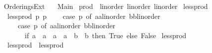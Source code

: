 %
\begin{isabellebody}%
%
%
\isadelimtheory
%
\endisadelimtheory
%
\isatagtheory
{}\isamarkupfalse%
\ Orderings{\isacharunderscore}{\kern0pt}Ext\isanewline
\ \ \ Main\isanewline
{}%
\endisatagtheory
{\isafoldtheory}%
%
\isadelimtheory
\isanewline
%
\endisadelimtheory
\isanewline
{}\isamarkupfalse%
\ prod\ {\isacharcolon}{\kern0pt}{\isacharcolon}{\kern0pt}\ {\isacharparenleft}{\kern0pt}linorder{\isacharcomma}{\kern0pt}\ linorder{\isacharparenright}{\kern0pt}\ linorder\isanewline
{}\isanewline
\isanewline
{}\isamarkupfalse%
\ less{\isacharunderscore}{\kern0pt}prod{\isacharprime}{\kern0pt}\ \isanewline
\ \ {\isachardoublequoteopen}less{\isacharunderscore}{\kern0pt}prod{\isacharprime}{\kern0pt}\ p{}\ p{}\ {\isasymequiv}\isanewline
\ \ \ case\ p{}\ of\ {\isacharparenleft}{\kern0pt}a{}{\isacharcolon}{\kern0pt}{\isacharcolon}{\kern0pt}{\isacharprime}{\kern0pt}a{\isacharcolon}{\kern0pt}{\isacharcolon}{\kern0pt}linorder{\isacharcomma}{\kern0pt}\ b{}{\isacharcolon}{\kern0pt}{\isacharcolon}{\kern0pt}{\isacharprime}{\kern0pt}b{\isacharcolon}{\kern0pt}{\isacharcolon}{\kern0pt}linorder{\isacharparenright}{\kern0pt}\ {\isasymRightarrow}\isanewline
\ \ \ \ \ case\ p{}\ of\ {\isacharparenleft}{\kern0pt}a{}{\isacharcolon}{\kern0pt}{\isacharcolon}{\kern0pt}{\isacharprime}{\kern0pt}a{\isacharcolon}{\kern0pt}{\isacharcolon}{\kern0pt}linorder{\isacharcomma}{\kern0pt}\ b{}{\isacharcolon}{\kern0pt}{\isacharcolon}{\kern0pt}{\isacharprime}{\kern0pt}b{\isacharcolon}{\kern0pt}{\isacharcolon}{\kern0pt}linorder{\isacharparenright}{\kern0pt}\ {\isasymRightarrow}\isanewline
\ \ \ \ \ \ \ if\ {\isacharparenleft}{\kern0pt}a{}\ {\isacharless}{\kern0pt}\ a{}{\isacharparenright}{\kern0pt}\ {\isasymor}\ {\isacharparenleft}{\kern0pt}a{}\ {\isacharequal}{\kern0pt}\ a{}\ {\isasymand}\ b{}\ {\isacharless}{\kern0pt}\ b{}{\isacharparenright}{\kern0pt}\ then\ True\ else\ False{\isachardoublequoteclose}\isanewline
\isanewline
{}\isamarkupfalse%
\ less{\isacharunderscore}{\kern0pt}prod\ \isanewline
\ \ {\isachardoublequoteopen}less{\isacharunderscore}{\kern0pt}prod\ {\isasymequiv}\ less{\isacharunderscore}{\kern0pt}prod{\isacharprime}{\kern0pt}{\isachardoublequoteclose}\isanewline

\end{isabellebody}
